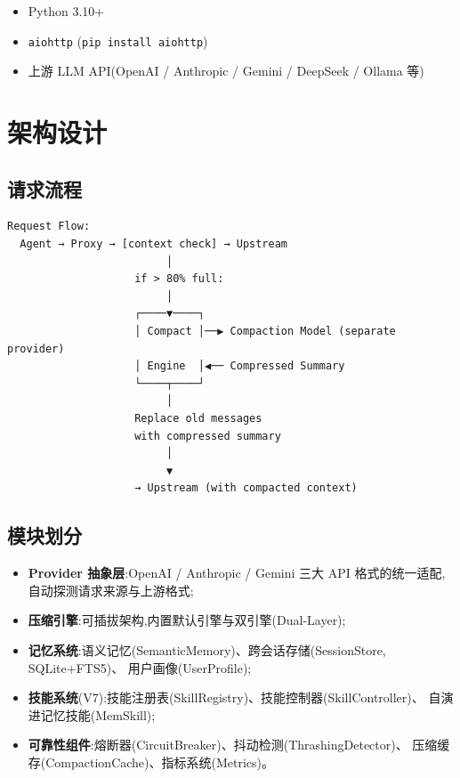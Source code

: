 \documentclass[11pt,a4paper]{article}
\begin{document}
\begin{itemize}
  \item Python 3.10+
  \item \texttt{aiohttp} (\texttt{pip install aiohttp})
  \item 上游 LLM API(OpenAI / Anthropic / Gemini / DeepSeek / Ollama 等)
\end{itemize}

\section{架构设计}

\subsection{请求流程}

\begin{verbatim}
Request Flow:
  Agent → Proxy → [context check] → Upstream
                         │
                    if > 80% full:
                         │
                    ┌────▼────┐
                    │ Compact │──▶ Compaction Model (separate provider)
                    │ Engine  │◀── Compressed Summary
                    └────┬────┘
                         │
                    Replace old messages
                    with compressed summary
                         │
                         ▼
                    → Upstream (with compacted context)
\end{verbatim}

\subsection{模块划分}

\begin{itemize}
  \item \textbf{Provider 抽象层}:OpenAI / Anthropic / Gemini 三大 API 格式的统一适配,
        自动探测请求来源与上游格式;
  \item \textbf{压缩引擎}:可插拔架构,内置默认引擎与双引擎(Dual-Layer);
  \item \textbf{记忆系统}:语义记忆(SemanticMemory)、跨会话存储(SessionStore, SQLite+FTS5)、
        用户画像(UserProfile);
  \item \textbf{技能系统}(V7):技能注册表(SkillRegistry)、技能控制器(SkillController)、
        自演进记忆技能(MemSkill);
  \item \textbf{可靠性组件}:熔断器(CircuitBreaker)、抖动检测(ThrashingDetector)、
        压缩缓存(CompactionCache)、指标系统(Metrics)。
\end{itemize}
\end{document}
